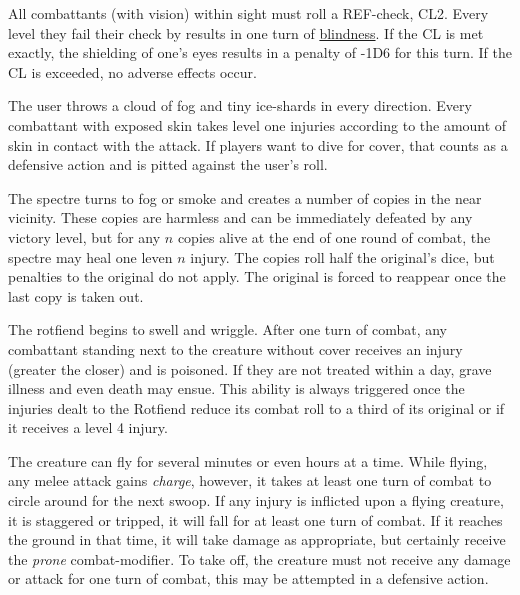{
    All combattants (with vision) within sight must roll a REF-check, CL2. Every level they fail their check by
    results in one turn of \hyperref[modifier:blindness]{blindness}. If the CL is met exactly, the shielding of one's eyes results in a penalty
    of -1D6 for this turn. If the CL is exceeded, no adverse effects occur.
}

{
    The user throws a cloud of fog and tiny ice-shards in every direction.
    Every combattant with exposed skin takes level one injuries according to
    the amount of skin in contact with the attack. If players want to dive for
    cover, that counts as a defensive action and is pitted against the user's roll.
}

{
    The spectre turns to fog or smoke and creates a number of copies in the near vicinity. These
    copies are harmless and can be immediately defeated by any victory level, but for any $n$ copies
    alive at the end of one round of combat, the spectre may heal one leven $n$ injury. The copies
    roll half the original's dice, but penalties to the original do not apply. The original is forced
    to reappear once the last copy is taken out.
}

{
    The rotfiend begins to swell and wriggle. After one turn of combat, any combattant standing next to
    the creature without cover receives an injury (greater the closer) and is poisoned. If they are not
    treated within a day, grave illness and even death may ensue. This ability is always triggered once
    the injuries dealt to the Rotfiend reduce its combat roll to a third of its original or if it receives
    a level 4 injury.
}

{
    The creature can fly for several minutes or even hours at a time. While flying, any melee attack gains \textit{charge}, 
    however, it takes at least one turn of combat to circle around for the next swoop. If any injury is inflicted upon a 
    flying creature, it is staggered or tripped,
    it will fall for at least one turn of combat. If it reaches the ground in that time, it will take damage as appropriate,
    but certainly receive the \textit{prone} combat-modifier. To take off, the creature must not receive any damage
    or attack for one turn of combat, this may be attempted in a defensive action.
}